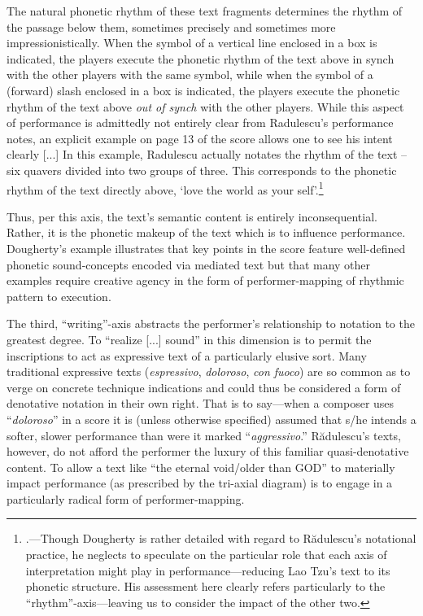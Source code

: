         \begin{smallquote}
            The natural phonetic rhythm of these text fragments determines the rhythm of the passage below them, sometimes precisely and sometimes more impressionistically. When the symbol of a vertical line enclosed in a box is indicated, the players execute the phonetic rhythm of the text above in synch with the other players with the same symbol, while when the symbol of a (forward) slash enclosed in a box is indicated, the players execute the phonetic rhythm of the text above \textit{out of synch} with the other players. While this aspect of performance is admittedly not entirely clear from Radulescu's performance notes, an explicit example on page 13 of the score allows one to see his intent clearly [...] In this example, Radulescu actually notates the rhythm of the text -- six quavers divided into two groups of three. This corresponds to the phonetic rhythm of the text directly above, `love the world as your self'.\footnote{\autocite[37]{Dougherty_2014}.---Though Dougherty is rather detailed with regard to R\u{a}dulescu's notational practice, he neglects to speculate on the particular role that each axis of interpretation might play in performance---reducing Lao Tzu's text to its phonetic structure. His assessment here clearly refers particularly to the ``rhythm''-axis---leaving us to consider the impact of the other two.}
        \end{smallquote}

        \noindent Thus, per this axis, the text's semantic content is entirely inconsequential. Rather, it is the phonetic makeup of the text which is to influence performance. Dougherty's example illustrates that key points in the score feature well-defined phonetic sound-concepts encoded via mediated text but that many other examples require creative agency in the form of performer-mapping of rhythmic pattern to execution.

        The third, ``writing''-axis abstracts the performer's relationship to notation to the greatest degree. To ``realize [...] sound'' in this dimension is to permit the inscriptions to act as expressive text of a particularly elusive sort. Many traditional expressive texts (\textit{espressivo}, \textit{doloroso}, \textit{con fuoco}) are so common as to verge on concrete technique indications and could thus be considered a form of denotative notation in their own right. That is to say---when a composer uses ``\textit{doloroso}'' in a score it is (unless otherwise specified) assumed that s/he intends a softer, slower performance than were it marked ``\textit{aggressivo}.'' R\u{a}dulescu's texts, however, do not afford the performer the luxury of this familiar quasi-denotative content. To allow a text like ``\textsf{the eternal void/older than GOD}''\autocite[4]{Radulescu_1993} to materially impact performance (as prescribed by the tri-axial diagram) is to engage in a particularly radical form of performer-mapping.
        
